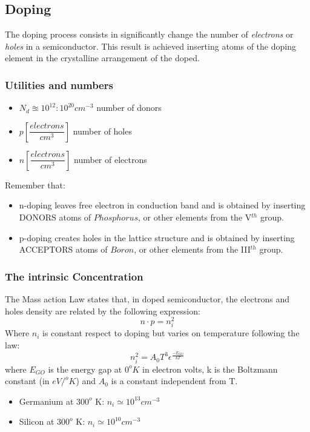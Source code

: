 \documentclass[12pt]{article}
\begin{document}
\subsection{Doping}
The doping process consists in significantly change the number of \textit{electrons }or \textit{holes} in a semiconductor.
This result is achieved inserting atoms of the doping element in the crystalline arrangement of the doped.
\subsubsection{Utilities and numbers}
\begin{itemize}
	\item $N_{d} \approxeq 10^{12} : 10^{20} cm^{-3}$ number of donors
	\item $p 	[\dfrac{electrons}{cm^3}]$ number of holes 
	\item $n 	[\dfrac{electrons}{cm^3}]$ number of electrons 
\end{itemize}
Remember that:
\begin{itemize}
	\item n-doping leaves free electron in conduction band and is obtained by inserting DONORS atoms of $Phosphorus$, or other elements from the V$^{th}$ group.
	\item p-doping creates holes in the lattice structure and is obtained by inserting ACCEPTORS atoms of $Boron$, or other elements from the III$^{th}$ group. 
\end{itemize}
\subsubsection{The intrinsic Concentration}
The Mass action Law states that, in doped semiconductor, the electrons and holes density are related by the following expression:
\begin{equation}
	n \cdot p = n_i^2
\end{equation}
Where $n_i$ is constant respect to doping but varies on temperature following the law:
\begin{equation}
	n_i^2 = A_0T^3\epsilon^{\frac{-E_{GO}}{kT}}
\end{equation}
where $E_{GO}$ is the energy gap at $0^{o}K$ in electron volts, k is the Boltzmann constant (in $eV/^oK$) and $A_0$ is a constant independent from T. 
\begin{itemize}
	\item Germanium at $300^o$ K: $n_i \simeq 10^{13} cm^{-3}$
	\item Silicon at $300^o$ K: $n_i \simeq 10^{10} cm^{-3}$
\end{itemize}
\end{document}
